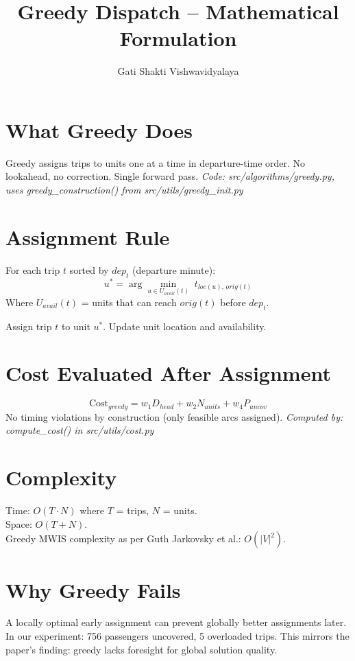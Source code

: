 \documentclass{article}
\title{Greedy Dispatch -- Mathematical Formulation}
\author{Gati Shakti Vishwavidyalaya}
\date{}
\begin{document}
\maketitle

\section{What Greedy Does}
Greedy assigns trips to units one at a time in departure-time order.
No lookahead, no correction. Single forward pass.
\textit{Code: src/algorithms/greedy.py, uses greedy\_construction() from src/utils/greedy\_init.py}

\section{Assignment Rule}
For each trip $t$ sorted by $dep_t$ (departure minute):
\[
  u^* = \arg\min_{u \in U_{avail}(t)} \; t_{loc(u),\, orig(t)}
\]
Where $U_{avail}(t)$ = units that can reach $orig(t)$ before $dep_t$.

Assign trip $t$ to unit $u^*$. Update unit location and availability.

\section{Cost Evaluated After Assignment}
\[
  \text{Cost}_{greedy} = w_1 D_{head} + w_2 N_{units} + w_4 P_{uncov}
\]
No timing violations by construction (only feasible arcs assigned).
\textit{Computed by: compute\_cost() in src/utils/cost.py}

\section{Complexity}
Time: $O(T \cdot N)$ where $T$ = trips, $N$ = units. \\
Space: $O(T + N)$. \\
Greedy MWIS complexity as per Guth Jarkovsky et al.: $O(|V|^2)$.

\section{Why Greedy Fails}
A locally optimal early assignment can prevent globally better assignments later.
In our experiment: 756 passengers uncovered, 5 overloaded trips.
This mirrors the paper's finding: greedy lacks foresight for global solution quality.
\end{document}
